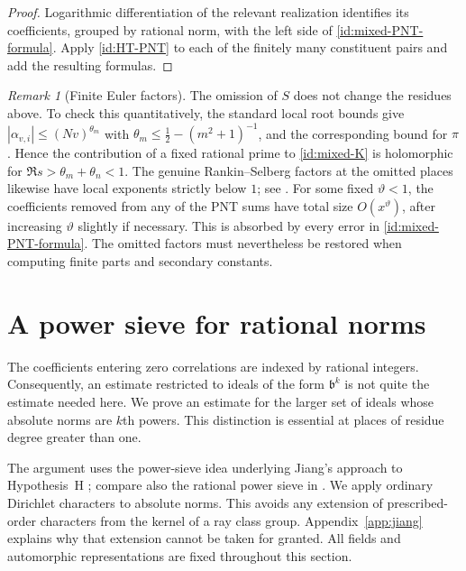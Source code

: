 \documentclass[11pt,reqno]{amsart}
\numberwithin{equation}{section}
\theoremstyle{definition}
\theoremstyle{remark}
\newtheorem{remark}[theorem]{Remark}
\begin{document}
\begin{proof}
Logarithmic differentiation of the relevant realization identifies its
coefficients, grouped by rational norm, with the left side of
\eqref{id:mixed-PNT-formula}. Apply \eqref{id:HT-PNT} to each of the
finitely many constituent pairs and add the resulting formulas.
\end{proof}

\begin{remark}[Finite Euler factors]\label{id:finite-factors}
The omission of $S$ does not change the residues above. To check this
quantitatively, the standard local root bounds give
$|\alpha_{v,i}|\le(Nv)^{\theta_m}$ with
$\theta_m\le\tfrac12-(m^2+1)^{-1}$, and the corresponding bound for
$\pi$. Hence the contribution of a fixed rational prime to
\eqref{id:mixed-K} is holomorphic for
$\Re s>\theta_m+\theta_{n}<1$. The genuine Rankin--Selberg factors at
the omitted places likewise have local exponents strictly below $1$;
see \cite[\S3.3]{HT}. For some fixed $\vartheta<1$, the coefficients
removed from any of the PNT sums have total size $O(x^\vartheta)$,
after increasing $\vartheta$ slightly if necessary. This is absorbed
by every error in \eqref{id:mixed-PNT-formula}. The omitted factors
must nevertheless be restored when computing finite parts and secondary
constants.
\end{remark}


\section{A power sieve for rational norms}\label{sec:norm-sieve}

The coefficients entering zero correlations are indexed by rational integers. Consequently, an estimate restricted to ideals of the form $\mathfrak b^k$ is not quite the estimate needed here. We prove an estimate for the larger set of ideals whose absolute norms are $k$th powers. This distinction is essential at places of residue degree greater than one.

The argument uses the power-sieve idea underlying Jiang's approach to Hypothesis~H \cite{Jiang}; compare also the rational power sieve in \cite{Munshi}. We apply ordinary Dirichlet characters to absolute norms. This avoids any extension of prescribed-order characters from the kernel of a ray class group. Appendix~\ref{app:jiang} explains why that extension cannot be taken for granted. All fields and automorphic representations are fixed throughout this section.
\end{document}
